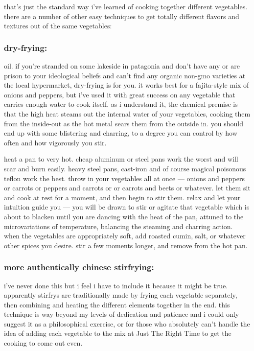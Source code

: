 that's just the standard way i've learned of cooking together different 
vegetables. there are a number of other easy techniques to get totally 
different flavors and textures out of the same vegetables:

\subsubsection{dry-frying:}

oil. if you're stranded on some lakeside in patagonia and don't have any or 
are prison to your ideological beliefs and can't find any organic non-gmo 
varieties at the local hypermarket, dry-frying is for you. it works best for a 
fajita-style mix of onions and peppers, but i've used it with great success on 
any vegetable that carries enough water to cook itself. as i understand it, 
the chemical premise is that the high heat steams out the internal water of 
your vegetables, cooking them from the inside-out as the hot metal sears them 
from the outside in. you should end up with some blistering and charring, to a 
degree you can control by how often and how vigorously you stir. 

heat a pan to very hot. cheap aluminum or steel pans work the worst and will 
scar and burn easily. heavy steel pans, cast-iron and of course magical 
poisonous teflon work the best. throw in your vegetables all at once --- 
onions and peppers or carrots or peppers and carrots or  or carrots 
and beets or whatever. let them sit and cook at rest for a moment, and then 
begin to stir them. relax and let your intuition guide you --- you will be 
drawn to stir or agitate that vegetable which is about to blacken until you 
are dancing with the heat of the pan, attuned to the microvariations of 
temperature, balancing the steaming and charring action. when the vegetables 
are appropriately soft, add roasted cumin, salt, or whatever other spices 
you desire. stir a few moments longer, and remove from the hot pan.

\subsubsection{more authentically chinese stirfrying:}

i've never done this but i feel i have to include it because it might be true. 
apparently stirfrys are traditionally made by frying each vegetable 
separately, then combining and heating the different elements together in the 
end. this technique is way beyond my levels of dedication and patience and i 
could only suggest it as a philosophical exercise, or for those who absolutely 
can't handle the idea of adding each vegetable to the mix at Just The Right 
Time to get the cooking to come out even.

